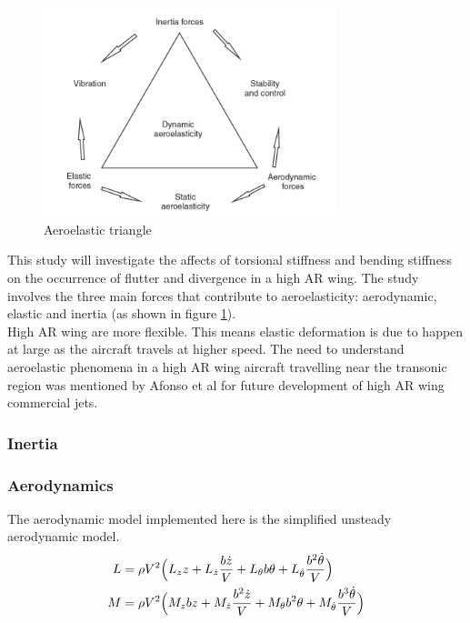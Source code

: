 \documentclass[11pt]{article}
\begin{document}
\begin{figure}
    \includegraphics[width=8.5cm]{figures/aeroelas_triangle.png}
    \caption{Aeroelastic triangle}
    \label{fig:aero-tri}
\end{figure} 

This study will investigate the affects of torsional stiffness and bending stiffness on the occurrence of flutter and divergence in a high AR wing. The study involves the three main forces that contribute to aeroelasticity: aerodynamic, elastic and inertia (as shown in figure \ref{fig:aero-tri}).\\

High AR wing are more flexible. This means elastic deformation is due to happen at large as the aircraft travels at higher speed. The need to understand aeroelastic phenomena in a high AR wing aircraft travelling near the transonic region was mentioned by Afonso et al \cite{Afonso2017AWings} for future development of high AR wing commercial jets.

\subsubsection{Inertia}

\subsubsection{Aerodynamics}
The aerodynamic model implemented here is the simplified unsteady aerodynamic model.
\begin{align}
L &= \rho V^2 \Big{(}L_z z + L_{\dot z}\frac{b\dot z}{V}+L_{\theta}b\theta + L_{\dot \theta}\frac{b^2 \dot \theta}{V}\Big{)} \\
M &= \rho V^2 \Big{(} M_z bz + M_{\dot z} \frac{b^2 \dot z}{V} + M_{\theta} b^2 \theta + M_{\dot \theta} \frac{b^3 \dot \theta}{V} \Big{)}
\end{align}
\end{document}
